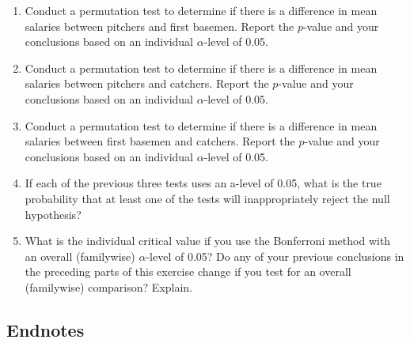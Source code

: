\documentclass[
]{book}
\begin{document}
\begin{enumerate}
\begin{enumerate}
    \item Conduct a permutation test to determine if there is a difference in mean salaries between pitchers and first basemen. Report the $p$-value and your conclusions based on an individual $\alpha$-level of 0.05.
    \item Conduct a permutation test to determine if there is a difference in mean salaries between pitchers and catchers. Report the $p$-value and your conclusions based on an individual $\alpha$-level of 0.05.
    \item Conduct a permutation test to determine if there is a difference in mean salaries between first basemen and catchers. Report the $p$-value and your conclusions based on an individual $\alpha$-level of 0.05.
    \item If each of the previous three tests uses an a-level of 0.05, what is the true probability that at least one of the tests will inappropriately reject the null hypothesis?
    \item What is the individual critical value if you use the Bonferroni method with an overall (familywise) $\alpha$-level of 0.05? Do any of your previous conclusions in the preceding parts of this exercise change if you test for an overall (familywise) comparison? Explain.
  \end{enumerate}
  
  
  
 \end{enumerate}

\hypertarget{endnotes}{%
\subsection*{Endnotes}\label{endnotes}}
\end{document}
